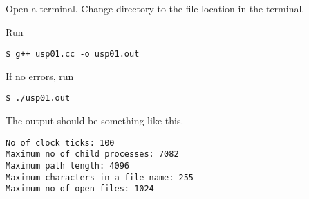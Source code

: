 Open a terminal. Change directory to the file location in the terminal.

Run
\begin{lstlisting}[style=shell-command]
$ g++ usp01.cc -o usp01.out
\end{lstlisting}

If no errors, run
\begin{lstlisting}[style=shell-command]
$ ./usp01.out
\end{lstlisting}

The output should be something like this.
\begin{lstlisting}[style=shell-output]
No of clock ticks: 100
Maximum no of child processes: 7082
Maximum path length: 4096
Maximum characters in a file name: 255
Maximum no of open files: 1024
\end{lstlisting}
